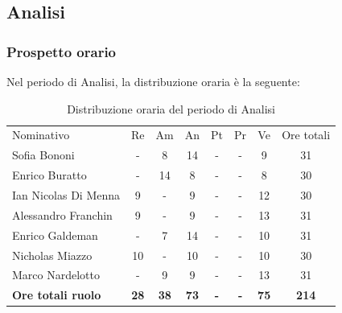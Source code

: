 \documentclass[../piano-di-progetto.tex]{subfiles}
\begin{document}
  \subsection{Analisi}

  \subsubsection{Prospetto orario}
  Nel periodo di Analisi, la distribuzione oraria è la seguente:
  \begin{table}[H]
    \centering
    \begin{tabular}{lccccccc}
      Nominativo                & Re         & Am         & An         & Pt         & Pr         & Ve         & Ore totali \\
      Sofia Bononi              & -          & 8          & 14          & -          & -          & 9          & 31          \\
      Enrico Buratto            & -          & 14         & 8          & -          & -          & 8          & 30          \\
      Ian Nicolas Di Menna      & 9          & -          & 9          & -          & -          & 12          & 30          \\
      Alessandro Franchin       & 9          & -          & 9          & -          & -          & 13          & 31         \\
      Enrico Galdeman           & -          & 7          & 14          & -          & -          & 10          & 31          \\
      Nicholas Miazzo           & 10         & -          & 10          & -          & -          & 10         & 30         \\
      Marco Nardelotto          & -          & 9          & 9         & -          & -          & 13          & 31          \\
      \textbf{Ore totali ruolo} & \textbf{28} & \textbf{38} & \textbf{73} & \textbf{-} & \textbf{-} & \textbf{75} & \textbf{214}
    \end{tabular}
    \caption{Distribuzione oraria del periodo di Analisi}
  \end{table}
\end{document}
